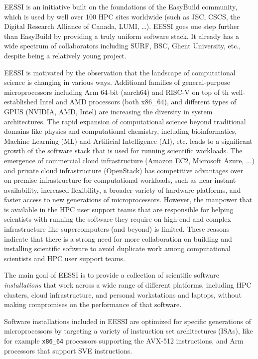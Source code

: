 EESSI is an initiative built on the foundations of the EasyBuild community, which is used by well over 100 HPC sites worldwide
(such as JSC, CSCS, the Digital Research Alliance of Canada, LUMI, \ldots). EESSI goes one step further than EasyBuild by providing a
truly uniform software stack. It already has a wide spectrum of collaborators including SURF, BSC, Ghent University, etc.,
despite being a relatively young project.

EESSI is motivated by the observation that the landscape of computational science is changing in various ways.
Additional families of general-purpose microprocessors including Arm 64-bit (aarch64) and RISC-V on top of th
well-established Intel and AMD processors (both x86\_64), and different types of GPUS (NVIDIA, AMD, Intel) are
increasing the diversity in system architectures. The rapid expansion of computational science beyond traditional
domains like physics and computational chemistry, including bioinformatics, Machine Learning (ML) and Artificial
Intelligence (AI), etc. leads to a significant growth of the software stack that is used for running scientific
workloads. The emergence of commercial cloud infrastructure (Amazon EC2, Microsoft Azure, ...) and private cloud
infrastructure (OpenStack) has competitive advantages over on-premise infrastructure for computational workloads, such
as near-instant availability, increased flexibility, a broader variety of hardware platforms, and faster access to new
generations of microprocessors. However, the manpower that is available in the HPC user support teams that are
responsible for helping scientists with running the software they require on high-end and complex infrastructure like
supercomputers (and beyond) is limited. These reasons indicate that there is a strong need for more collaboration on
building and installing scientific software to avoid duplicate work among computational scientists and HPC user support
teams.

The main goal of EESSI is to provide a collection of scientific software \emph{installations} that work across a wide range of
different platforms, including HPC clusters, cloud infrastructure, and personal workstations and laptops, without making
compromises on the performance of that software.

Software installations included in EESSI are optimized for specific generations of microprocessors by targeting a
variety of instruction set architectures (ISAs), like for example \texttt{x86\_64} processors supporting the
AVX-512 instructions, and Arm processors that support SVE instructions.

